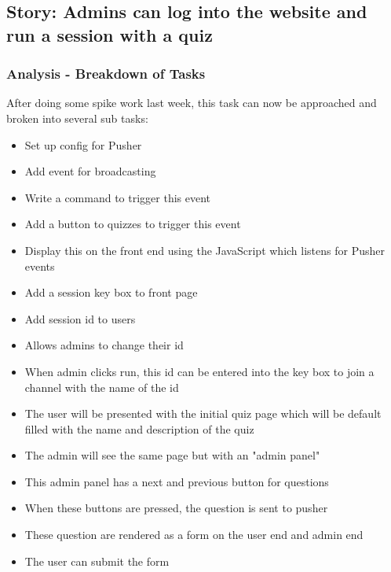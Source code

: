 \subsection{Story: Admins can log into the website and run a session with a quiz}
\subsubsection{Analysis - Breakdown of Tasks}
After doing some spike work last week, this task can now be approached and broken into several sub tasks:
\begin{itemize}
	\item Set up config for Pusher
	\item Add event for broadcasting
	\item Write a command to trigger this event
	\item Add a button to quizzes to trigger this event
	\item Display this on the front end using the JavaScript which listens for Pusher events
	\item Add a session key box to front page
	\item Add session id to users
	\item Allows admins to change their id
	\item When admin clicks run, this id can be entered into the key box to join a channel with the name of the id
	\item The user will be presented with the initial quiz page which will be default filled with the name and description of the quiz
	\item The admin will see the same page but with an "admin panel"
	\item This admin panel has a next and previous button for questions
	\item When these buttons are pressed, the question is sent to pusher
	\item These question are rendered as a form on the user end and admin end
	\item The user can submit the form
\end{itemize}
